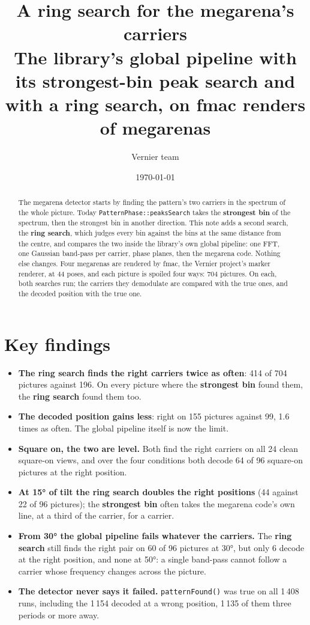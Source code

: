 \documentclass[10pt,a4paper]{article}
\title{A ring search for the megarena's carriers\\[2pt]
\large The library's global pipeline with its strongest-bin peak search and
with a ring search, on fmac renders of megarenas}
\author{Vernier team}
\date{\today}
\newcommand{\maxs}{\textcolor{maxorange}{\textbf{strongest bin}}}
\newcommand{\ring}{\textcolor{ringblue}{\textbf{ring search}}}
\begin{document}
\maketitle

\begin{abstract}
\noindent
The megarena detector starts by finding the pattern's two carriers in the
spectrum of the whole picture. Today \texttt{PatternPhase::peaksSearch} takes
the \maxs{} of the spectrum, then the strongest bin in another direction. This
note adds a second search, the \ring, which judges every bin against the bins
at the same distance from the centre, and compares the two inside the
library's own global pipeline: one FFT, one Gaussian band-pass per carrier,
phase planes, then the megarena code. Nothing else changes. Four megarenas are
rendered by fmac, the Vernier project's marker renderer, at 44 poses, and
each picture is spoiled four ways: 704 pictures. On each, both searches run;
the carriers they demodulate are compared with the true ones, and the decoded
position with the true one.
\end{abstract}

\section*{Key findings}

\begin{itemize}
  \item \textbf{The \ring{} finds the right carriers twice as often}: 414 of
        704 pictures against 196. On every picture where the \maxs{} found
        them, the \ring{} found them too.
  \item \textbf{The decoded position gains less}: right on 155 pictures against
        99, 1.6 times as often. The global pipeline itself is now the limit.
  \item \textbf{Square on, the two are level.} Both find the right carriers on
        all 24 clean square-on views, and over the four conditions both decode
        64 of 96 square-on pictures at the right position.
  \item \textbf{At 15° of tilt the \ring{} doubles the right positions} (44
        against 22 of 96 pictures); the \maxs{} often takes the megarena
        code's own line, at a third of the carrier, for a carrier.
  \item \textbf{From 30° the global pipeline fails whatever the carriers.}
        The \ring{} still finds the right pair on 60 of 96 pictures at 30°,
        but only 6 decode at the right position, and none at 50°: a single
        band-pass cannot follow a carrier whose frequency changes across the
        picture.
  \item \textbf{The detector never says it failed.} \texttt{patternFound()}
        was true on all 1\,408 runs, including the 1\,154 decoded at a wrong
        position, 1\,135 of them three periods or more away.
\end{itemize}
\end{document}
